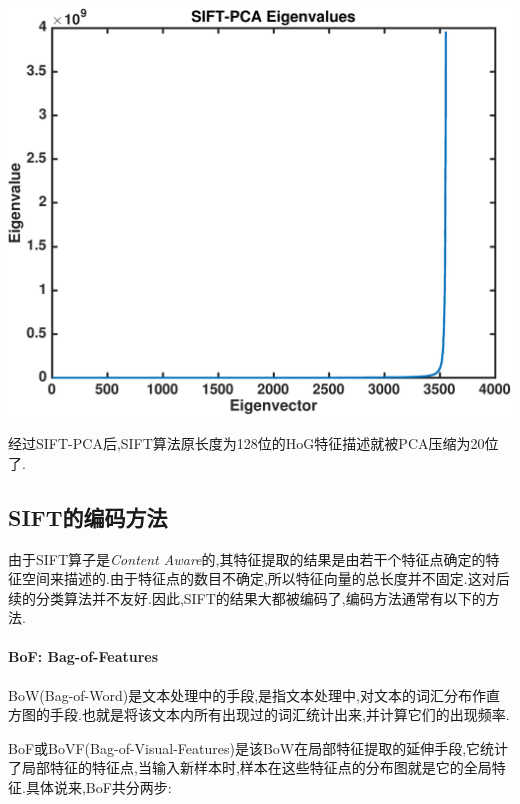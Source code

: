 			\begin{center}
		\begin{minipage}[t]{\linewidth}
		\center
		{
		\includegraphics[width=\MyFactor\textwidth]{Img/c3/sift_pca_eigen} 
		}
		\end{minipage}
		\medskip
		\end{center}
		
	经过SIFT-PCA后,SIFT算法原长度为128位的HoG特征描述就被PCA压缩为20位了.
		

\subsection{SIFT的编码方法}
由于SIFT算子是\textit{Content Aware}的,其特征提取的结果是由若干个特征点确定的特征空间来描述的.由于特征点的数目不确定,所以特征向量的总长度并不固定.这对后续的分类算法并不友好.因此,SIFT的结果大都被编码了,编码方法通常有以下的方法.\cite{chatfield2011devil}
	\paragraph{BoF: Bag-of-Features}
	BoW(Bag-of-Word)是文本处理中的手段,是指文本处理中,对文本的词汇分布作直方图的手段.也就是将该文本内所有出现过的词汇统计出来,并计算它们的出现频率.\newline
	
	BoF或BoVF(Bag-of-Visual-Features)是该BoW在局部特征提取的延伸手段,它统计了局部特征的特征点,当输入新样本时,样本在这些特征点的分布图就是它的全局特征.具体说来,BoF共分两步: \newline
	
